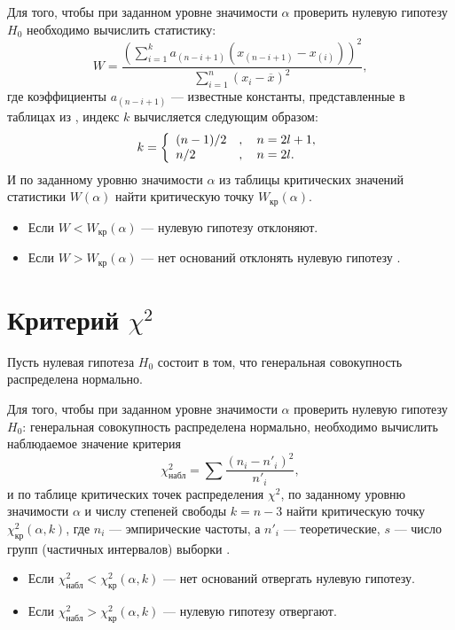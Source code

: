 Для того, чтобы при заданном уровне значимости $\alpha$ проверить нулевую гипотезу $H_0$ необходимо вычислить статистику:
\begin{equation*}
	W = \frac{(\sum_{i=1}^{k}{a_{(n-i+1)} (x_{(n-i+1)} - x_{(i)})})^2}{\sum_{i=1}^{n}{(x_i - \overline{x})^2}},
\end{equation*}
где коэффициенты $a_{(n-i+1)}$ --- известные константы, представленные в таблицах из \cite{ShapiroWilk1965}, индекс $k$ вычисляется следующим образом:
\begin{equation*}
k = \left\{
 \begin{array}{l l}
   (n-1) / 2 &, \quad n = 2l + 1, \\
   n / 2 &, \quad n = 2l.
 \end{array} \right.
\end{equation*} 
И по заданному уровню значимости $\alpha$ из таблицы критических значений статистики $W(\alpha)$ \cite{ShapiroWilk1965} найти критическую точку $W_{\textrm{кр}}(\alpha)$.
\begin{itemize}
	\item Если $W < W_{\textrm{кр}}(\alpha)$ --- нулевую гипотезу отклоняют.
	\item Если $W > W_{\textrm{кр}}(\alpha)$ --- нет оснований отклонять нулевую гипотезу \cite{Kobzar2006}.
\end{itemize}


\section*{Критерий $\chi^2$} %
\label{sec:chisq}
Пусть нулевая гипотеза $H_0$ состоит в том, что генеральная совокупность распределена нормально.

Для того, чтобы при заданном уровне значимости $\alpha$ проверить нулевую гипотезу $H_0$: генеральная совокупность распределена нормально, необходимо вычислить наблюдаемое значение критерия
\begin{equation*}
	\chi_{\textrm{набл}}^2 = \sum{\frac{(n_i-n'_i)^2}{n'_i}},
\end{equation*}
и по таблице критических точек распределения $\chi^2$, по заданному уровню значимости $\alpha$ и числу степеней свободы $k = n - 3$ найти критическую точку $\chi_{\textrm{кр}}^2(\alpha, k)$, где $n_i$ --- эмпирические частоты, а $n'_i$ --- теоретические, $s$ --- число групп (частичных интервалов) выборки \cite{Gmurman2003}.
\begin{itemize}
	\item Если $\chi_{\textrm{набл}}^2 < \chi_{\textrm{кр}}^2(\alpha, k)$ --- нет оснований отвергать нулевую гипотезу.
	\item Если $\chi_{\textrm{набл}}^2 > \chi_{\textrm{кр}}^2(\alpha, k)$ --- нулевую гипотезу отвергают.
\end{itemize}

